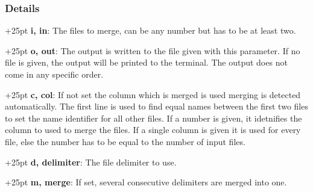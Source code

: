 \documentclass[a4paper,10pt,parskip=half]{scrreprt}
\begin{document}
\subsubsection{Details}

\hangindent+25pt 
\textbf{i, in}: The files to merge, can be any number but has to be at least
two.

\hangindent+25pt 
\textbf{o, out}: The output is written to the file given with this parameter. If
no file is given, the output will be printed to the terminal. The output does
not come in any specific order.

\hangindent+25pt 
\textbf{c, col}: If not set the column which is merged is used merging is
detected automatically. The first line is used to find equal names between the
first two files to set the name identifier for all other files. 
If a number is given, it idetnifies the column to used to merge the files. If a single column is given it is used for every file, else the number has to be equal to the number of input files.

\hangindent+25pt 
\textbf{d, delimiter}: The file delimiter to use. 

\hangindent+25pt 
\textbf{m, merge}: If set, several consecutive delimiters are merged into one.
\end{document}
